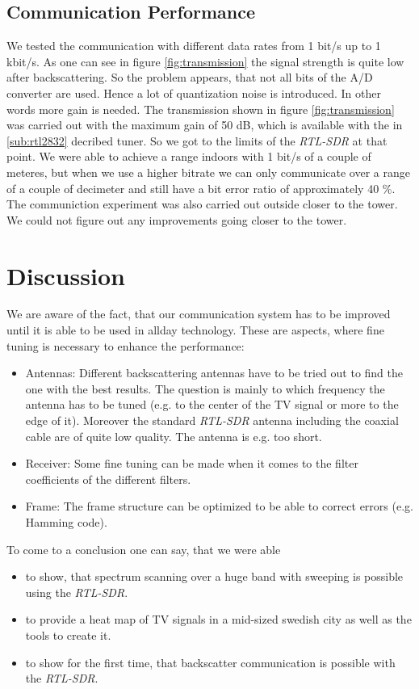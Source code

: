\documentclass[conference]{IEEEtran}
\begin{document}
\begin{figure}[h]
\label{fig:haversine}
\end{figure}

\subsection{Communication Performance}
We tested the communication with different data rates from 1 bit/s up to
1 kbit/s. As one can see in figure \ref{fig:transmission} the signal
strength is quite low after backscattering. So the problem appears, that
not all bits of the A/D converter are used. Hence a lot of quantization
noise is introduced. In other words more gain is needed. The
transmission shown in figure \ref{fig:transmission} was carried out with
the maximum gain of 50 dB, which is available with the in
\ref{sub:rtl2832} decribed tuner. So we got to the limits of the
\textit{RTL-SDR} at that point. We were able to achieve a range indoors
with 1 bit/s of a couple of meteres, but when we use a higher bitrate we
can only communicate over a range of a couple of decimeter and still
have a bit error ratio of approximately 40 \%. The communiction
experiment was also carried out outside closer to the tower. We could
not figure out any improvements going closer to the tower.  
\section{Discussion}
We are aware of the fact, that our communication system has to be improved until it is able to be used in allday technology. These are aspects, where fine tuning is necessary to enhance the performance:
\begin{itemize}
	\item Antennas: Different backscattering antennas have to be
tried out to find the one with the best results. The question is mainly
to which frequency the antenna has to be tuned (e.g. to the center of
the TV signal or more to the edge of it). Moreover the standard
\textit{RTL-SDR} antenna including the coaxial cable are of quite low
quality. The antenna is e.g. too short. 
	\item Receiver: Some fine tuning can be made when it comes to the filter coefficients of the different filters.
	\item Frame: The frame structure can be optimized to be able to correct errors (e.g. Hamming code).  
\end{itemize}   
To come to a conclusion one can say, that we were able
\begin{itemize}
	\item to show, that spectrum scanning over a huge band with sweeping is possible using the \textit{RTL-SDR}.
	\item to provide a heat map of TV signals in a mid-sized swedish city as well as the tools to create it.
	\item to show for the first time, that backscatter communication is possible with the \textit{RTL-SDR}.
\end{itemize}
\end{document}
